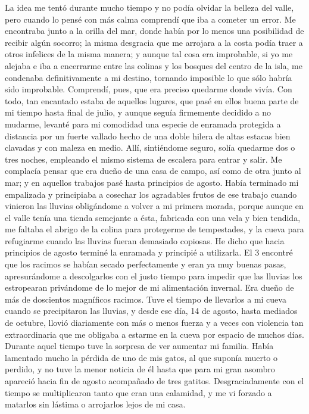 \documentclass{novela}
\begin{document}
    La idea me tentó durante mucho tiempo y no podía olvidar la belleza del valle, pero cuando lo pensé con más calma comprendí que iba a cometer un error. Me encontraba junto a la orilla del mar, donde había por lo menos una posibilidad de recibir algún socorro; la misma desgracia que me arrojara a la costa podía traer a otros infelices de la misma manera; y aunque tal cosa era improbable, si yo me alejaba e iba a encerrarme entre las colinas y los bosques del centro de la isla, me condenaba definitivamente a mi destino, tornando imposible lo que sólo habría sido improbable. Comprendí, pues, que era preciso quedarme donde vivía.
    Con todo, tan encantado estaba de aquellos lugares, que pasé en ellos buena parte de mi tiempo hasta final de julio, y aunque seguía firmemente decidido a no mudarme, levanté para mi comodidad una especie de enramada protegida a distancia por un fuerte vallado hecho de una doble hilera de altas estacas bien clavadas y con maleza en medio. Allí, sintiéndome seguro, solía quedarme dos o tres noches, empleando el mismo sistema de escalera para entrar y salir. Me complacía pensar que era dueño de una casa de campo, así como de otra junto al mar; y en aquellos trabajos pasé hasta principios de agosto.
    Había terminado mi empalizada y principiaba a cosechar los agradables frutos de ese trabajo cuando vinieron las lluvias obligándome a volver a mi primera morada, porque aunque en el valle tenía una tienda semejante a ésta, fabricada con una vela y bien tendida, me faltaba el abrigo de la colina para protegerme de tempestades, y la cueva para refugiarme cuando las lluvias fueran demasiado copiosas. He dicho que hacia principios de agosto terminé la enramada y principié a utilizarla. El 3 encontré que los racimos se habían secado perfectamente y eran ya muy buenas pasas, apresurándome a descolgarlos con el justo tiempo para impedir que las lluvias los estropearan privándome de lo mejor de mi alimentación invernal. Era dueño de más de doscientos magníficos racimos. Tuve el tiempo de llevarlos a mi cueva cuando se precipitaron las lluvias, y desde ese día, 14 de agosto, hasta mediados de octubre, llovió diariamente con más o menos fuerza y a veces con violencia tan extraordinaria que me obligaba a estarme en la cueva por espacio de muchos días.
    Durante aquel tiempo tuve la sorpresa de ver aumentar mi familia. Había lamentado mucho la pérdida de uno de mis gatos, al que suponía muerto o perdido, y no tuve la menor noticia de él hasta que para mi gran asombro apareció hacia fin de agosto acompañado de tres gatitos. Desgraciadamente con el tiempo se multiplicaron tanto que eran una calamidad, y me vi forzado a matarlos sin lástima o arrojarlos lejos de mi casa.
\end{document}

